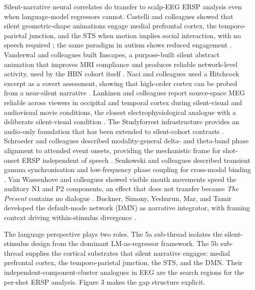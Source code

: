 \documentclass[preprint,12pt]{elsarticle}
\begin{document}
Silent-narrative neural correlates do transfer to scalp-EEG ERSP analysis even when language-model regressors cannot. Castelli and colleagues showed that silent geometric-shape animations engage medial prefrontal cortex, the temporo-parietal junction, and the STS when motion implies social interaction, with no speech required \cite{castelli2000heider}; the same paradigm in autism shows reduced engagement \cite{Castelli2002AutismAS}. Vanderwal and colleagues built Inscapes, a purpose-built silent abstract animation that improves MRI compliance and produces reliable network-level activity, used by the HBN cohort itself \cite{Vanderwal2015InscapesAM}. Naci and colleagues used a Hitchcock excerpt as a covert assessment, showing that high-order cortex can be probed from a near-silent narrative \cite{Naci2014ACN}. Lankinen and colleagues report source-space MEG reliable across viewers in occipital and temporal cortex during silent-visual and audiovisual movie conditions, the closest electrophysiological analogue with a deliberate silent-visual condition \cite{Lankinen2014IntersubjectCO}. The Studyforrest infrastructure provides an audio-only foundation that has been extended to silent-cohort contrasts \cite{Hanke2014AH7}. Schroeder and colleagues described modality-general delta- and theta-band phase alignment to attended event onsets, providing the mechanistic frame for shot-onset ERSP independent of speech \cite{Schroeder2009LowfrequencyNO}. Senkowski and colleagues described transient gamma synchronisation and low-frequency phase coupling for cross-modal binding \cite{Senkowski2008CrossmodalBT}. Van Wassenhove and colleagues showed visible mouth movements speed the auditory N1 and P2 components, an effect that does not transfer because \textit{The Present} contains no dialogue \cite{Wassenhove2005VisualSS}. Buckner, Simony, Yeshurun, Mar, and Tamir developed the default-mode network (DMN) as narrative integrator, with framing context driving within-stimulus divergence \cite{Buckner2008TheBD,Simony2016DynamicRO,Yeshurun2017SameSD,Mar2011TheNB,Tamir2016ReadingFA}.

The language perspective plays two roles. The 5a sub-thread isolates the silent-stimulus design from the dominant LM-as-regressor framework. The 5b sub-thread supplies the cortical substrates that silent narrative engages: medial prefrontal cortex, the temporo-parietal junction, the STS, and the DMN. Their independent-component-cluster analogues in EEG are the search regions for the per-shot ERSP analysis. Figure 3 makes the gap structure explicit.
\end{document}
